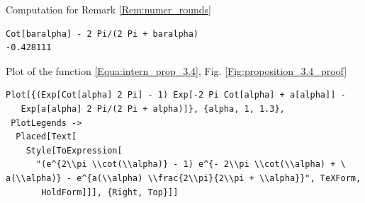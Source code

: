 \documentclass[reqno]{amsart}
\theoremstyle{definition} \newtheorem{definition}{Definition}[section]
\theoremstyle{definition} \newtheorem{remark}[definition]{Remark}
\theoremstyle{plain} \newtheorem{lemma}[definition]{Lemma}
\theoremstyle{plain} \newtheorem{proposition}[definition]{Proposition}
\theoremstyle{plain} \newtheorem{theorem}[definition]{Theorem}
\theoremstyle{plain} \newtheorem{corollary}[definition]{Corollary}
\theoremstyle{definition} \newtheorem{example}[definition]{Example}
\theoremstyle{plain} \newtheorem{claim}[clai]{Claim}
\theoremstyle{definition} \newtheorem{assumption}[definition]{Assumption}
\theoremstyle{definition} \newtheorem{observation}[definition]{Observation}
\newcommand{\1}{\mathbbm 1}
\numberwithin{equation}{section} %
\theoremstyle{plain} \newtheorem*{theorem*}{Theorem}
\theoremstyle{plain} \newtheorem{mthm}[maintheorem]{Main Theorem}
\theoremstyle{plain} \newtheorem*{mthm*}{Main Theorem}
\theoremstyle{plain} \newtheorem*{conjecture*}{Conjecture}
\theoremstyle{plain} \newtheorem{conjecture}[definition]{Conjecture}
\theoremstyle{plain} \newtheorem*{problem*}{Problem}
\begin{document}
\bigskip


\bigskip

\noindent Computation for Remark \ref{Rem:numer_rounds}
\medskip
\begin{verbatim}
Cot[baralpha] - 2 Pi/(2 Pi + baralpha)
-0.428111
\end{verbatim}
\medskip
Plot of the function \eqref{Equa:intern_prop_3.4}, Fig. \ref{Fig:proposition_3.4_proof}
\medskip \begin{verbatim}
Plot[{(Exp[Cot[alpha] 2 Pi] - 1) Exp[-2 Pi Cot[alpha] + a[alpha]] - 
   Exp[a[alpha] 2 Pi/(2 Pi + alpha)]}, {alpha, 1, 1.3}, 
 PlotLegends -> 
  Placed[Text[
    Style[ToExpression[
      "(e^{2\\pi \\cot(\\alpha)} - 1) e^{- 2\\pi \\cot(\\alpha) + \
a(\\alpha)} - e^{a(\\alpha) \\frac{2\\pi}{2\\pi + \\alpha}}", TeXForm,
       HoldForm]]], {Right, Top}]]
\end{verbatim}

\bigskip


\bigskip
\end{document}
